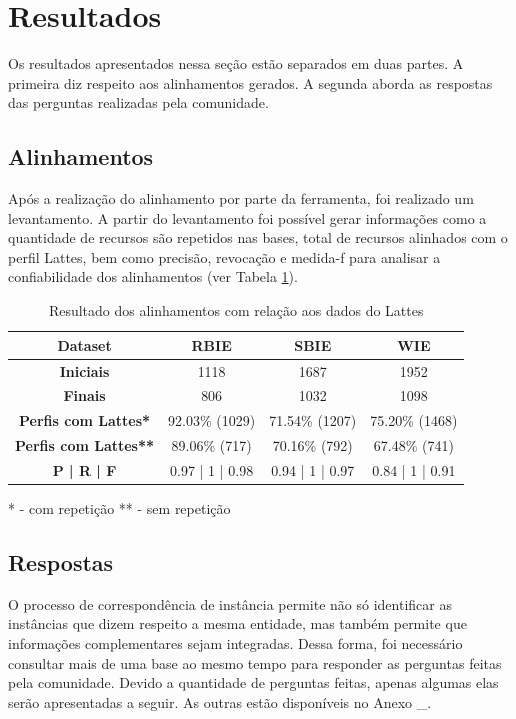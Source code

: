 \section{Resultados}
Os resultados apresentados nessa seção estão separados em duas partes. A primeira diz respeito aos alinhamentos gerados. A segunda aborda as respostas das perguntas realizadas pela comunidade.

\subsection{Alinhamentos}
Após a realização do alinhamento por parte da ferramenta, foi realizado um levantamento. A partir do levantamento foi possível gerar informações como a quantidade de recursos são repetidos nas bases, total de recursos alinhados com o perfil Lattes, bem como precisão, revocação e medida-f \cite{goutte2005probabilistic} para analisar a confiabilidade dos alinhamentos (ver Tabela \ref{tab:case_study}).

\begin{table}[!ht]
	\centering
	\caption{ Resultado dos alinhamentos com relação aos dados do Lattes}
	\label{tab:case_study}
	\begin{tabular}{|c|c|c|c|}
		\hline
		\textbf{Dataset}	&	\textbf{RBIE}	&	\textbf{SBIE}	&	\textbf{WIE}  \\ \hline
		\textbf{Iniciais}	&	1118	&	1687	&	1952 \\ \hline
		\textbf{Finais}	&	806	&	1032	&	1098 \\ \hline
		\textbf{Perfis com Lattes*}	&	92.03\% (1029)	&	71.54\% (1207)	&	75.20\% (1468) \\ \hline
		\textbf{Perfis com Lattes**}	&	89.06\% (717)	&	70.16\% (792)	&	67.48\% (741) \\ \hline
		\textbf{P | R | F}	&	0.97 | 1 | 0.98	&	0.94 | 1 | 0.97 	&	0.84 | 1 | 0.91 \\ \hline
	\end{tabular}
\end{table}
* - com repetição
** - sem repetição

\subsection{Respostas}
O processo de correspondência de instância permite não só identificar as instâncias que dizem respeito a mesma entidade, mas também permite que informações complementares sejam integradas. Dessa forma, foi necessário consultar mais de uma base ao mesmo tempo para responder as perguntas feitas pela comunidade. Devido a quantidade de perguntas feitas, apenas algumas elas serão apresentadas a seguir. As outras estão disponíveis no Anexo \_.

